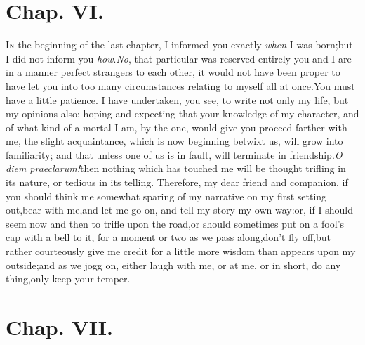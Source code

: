 \documentclass{article}
\begin{document}
\section{Chap. VI.}

\lettrine{I}{n} the beginning of the last chapter,
I informed you exactly \textit{when} I was born;\tsk but I did not inform
you \textit{how}.\break\textit{No}, that particular was reserved entirely 
you and I are in a manner
perfect stran\-gers to each other, it would not have been proper to
have let you into too many circumstances relating to myself all at
once.\tsk You must have a little patience. I have undertaken, you see, to write not only my life,
but my opinions also; hoping and expecting that your knowledge\pb
of my character, and of what kind of a
mortal I am, by the one, would give you
proceed farther with me, the slight ac\-quaintance, which is now beginning betwixt us,
will grow into familiarity; and that unless one of us is in fault, will\break
terminate in friendship.\tsk  \textit{O diem
prae\-clarum!}\tsh  then nothing which has touched me will be
thought trifling in its nature, or tedious in its telling.\break
Therefore, my dear friend and companion, if you should think me
somewhat sparing of my narrative on my first setting out,\tsk  bear
with me,\tsk  and let me go on, and tell my story my own
way:\tsh  or, if I should seem now and then to trifle upon the
road,\tsk  or should sometimes put on a fool’s cap with a
bell to it, for a moment or two as we pass along,\tsk  don’t
fly off,\tsk  but rather courteously give me credit for a little
more wisdom than appears upon my outside;\tsk  and as we jogg on, either laugh with
me, or at me, or in short, do any thing,\tsk  only keep your temper.

\section{Chap. VII.}
\end{document}
